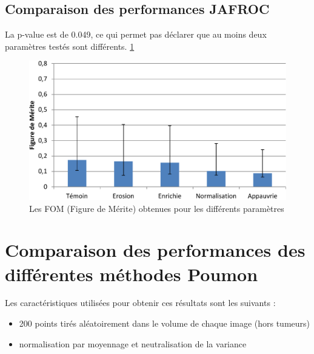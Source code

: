 \subsection{Comparaison des performances JAFROC}

La p-value est de 0.049, ce qui permet pas déclarer que au moins deux paramètres testés sont différents. \ref{lab:fom_param}


\begin{figure}[h!]
 \begin{center}
   \includegraphics[width=15cm]{images/FOM_param}
 \end{center}
 \caption{ \label{lab:fom_param} Les FOM (Figure de Mérite) obtenues pour les différents paramètres}
\end{figure}

\FloatBarrier

\section{Comparaison des performances des différentes méthodes Poumon}

Les caractéristiques utilisées pour obtenir ces résultats sont les suivants :

\begin{itemize}
 \item 200 points tirés aléatoirement dans le volume de chaque image (hors tumeurs)
 \item normalisation par moyennage et neutralisation de la variance 
\end{itemize}


